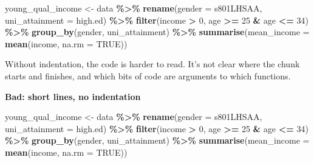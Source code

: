 \documentclass[
]{book}
\newenvironment{Shaded}{\begin{snugshade}}{\end{snugshade}}
\newcommand{\DataTypeTok}[1]{\textcolor[rgb]{0.13,0.29,0.53}{#1}}
\newcommand{\DecValTok}[1]{\textcolor[rgb]{0.00,0.00,0.81}{#1}}
\newcommand{\KeywordTok}[1]{\textcolor[rgb]{0.13,0.29,0.53}{\textbf{#1}}}
\newcommand{\NormalTok}[1]{#1}
\newcommand{\OperatorTok}[1]{\textcolor[rgb]{0.81,0.36,0.00}{\textbf{#1}}}
\newcommand{\OtherTok}[1]{\textcolor[rgb]{0.56,0.35,0.01}{#1}}
\newcommand{\StringTok}[1]{\textcolor[rgb]{0.31,0.60,0.02}{#1}}
\begin{document}
\begin{Shaded}
\begin{Highlighting}[]
\NormalTok{young\_qual\_income \textless{}{-}}\StringTok{ }\NormalTok{data }\OperatorTok{\%\textgreater{}\%}
\StringTok{  }\KeywordTok{rename}\NormalTok{(}\DataTypeTok{gender =}\NormalTok{ s801LHSAA,}
         \DataTypeTok{uni\_attainment =}\NormalTok{ high.ed) }\OperatorTok{\%\textgreater{}\%}
\StringTok{  }\KeywordTok{filter}\NormalTok{(income }\OperatorTok{\textgreater{}}\StringTok{ }\DecValTok{0}\NormalTok{,}
\NormalTok{         age }\OperatorTok{\textgreater{}=}\StringTok{ }\DecValTok{25} \OperatorTok{\&}\StringTok{ }\NormalTok{age }\OperatorTok{\textless{}=}\StringTok{ }\DecValTok{34}\NormalTok{) }\OperatorTok{\%\textgreater{}\%}
\StringTok{  }\KeywordTok{group\_by}\NormalTok{(gender, }
\NormalTok{           uni\_attainment) }\OperatorTok{\%\textgreater{}\%}
\StringTok{  }\KeywordTok{summarise}\NormalTok{(}\DataTypeTok{mean\_income =} \KeywordTok{mean}\NormalTok{(income, }
                               \DataTypeTok{na.rm =} \OtherTok{TRUE}\NormalTok{))}
\end{Highlighting}
\end{Shaded}

Without indentation, the code is harder to read. It's not clear where the chunk starts and finishes, and which bits of code are arguments to which functions.

\textbf{Bad: short lines, no indentation}

\begin{Shaded}
\begin{Highlighting}[]
\NormalTok{young\_qual\_income \textless{}{-}}\StringTok{ }\NormalTok{data }\OperatorTok{\%\textgreater{}\%}\StringTok{ }
\KeywordTok{rename}\NormalTok{(}\DataTypeTok{gender =}\NormalTok{ s801LHSAA,}
\DataTypeTok{uni\_attainment =}\NormalTok{ high.ed) }\OperatorTok{\%\textgreater{}\%}\StringTok{ }
\KeywordTok{filter}\NormalTok{(income }\OperatorTok{\textgreater{}}\StringTok{ }\DecValTok{0}\NormalTok{,}
\NormalTok{age }\OperatorTok{\textgreater{}=}\StringTok{ }\DecValTok{25} \OperatorTok{\&}\StringTok{ }\NormalTok{age }\OperatorTok{\textless{}=}\StringTok{ }\DecValTok{34}\NormalTok{) }\OperatorTok{\%\textgreater{}\%}
\KeywordTok{group\_by}\NormalTok{(gender, uni\_attainment) }\OperatorTok{\%\textgreater{}\%}\StringTok{ }
\KeywordTok{summarise}\NormalTok{(}\DataTypeTok{mean\_income =} \KeywordTok{mean}\NormalTok{(income, }\DataTypeTok{na.rm =} \OtherTok{TRUE}\NormalTok{))}
\end{Highlighting}
\end{Shaded}
\end{document}

